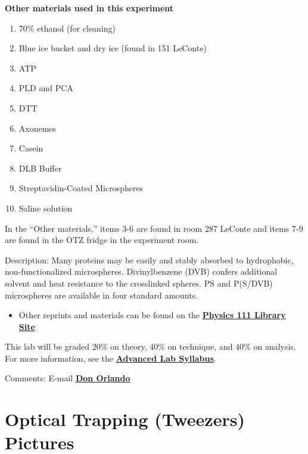 \documentclass{../lab}
\begin{document}
\newpage

\textbf{Other materials used in this experiment}

\begin{enumerate}
    \item 70\% ethanol (for cleaning)

    \item Blue ice bucket and dry ice (found in 151 LeConte)

    \item ATP

    \item PLD and PCA

    \item DTT

    \item Axonemes

    \item Casein

    \item DLB Buffer

    \item Streptavidin-Coated Microspheres

    \item Saline solution
\end{enumerate}

In the ``Other materials,'' items 3-6 are found in room 287 LeConte and items 7-9 are found in the OTZ fridge in the experiment room.

Description: Many proteins may be easily and stably absorbed to hydrophobic, non-functionalized microspheres. Divinylbenzene (DVB) confers additional solvent and heat resistance to the crosslinked spheres. PS and P(S/DVB) microspheres are available in four standard amounts.

\begin{itemize}
    \item Other reprints and materials can be found on the \href{http://physics111.lib.berkeley.edu/Physics111/Reprints/OTZ/OTZ\_index.html}{\textbf{Physics 111 Library Site}}
\end{itemize}

This lab will be graded 20\% on theory, 40\% on technique, and 40\% on analysis. For more information, see the \href{\AdvancedLabSyllabus}{\textbf{Advanced Lab Syllabus}}.

Comments: E-mail \href{\MailDonOrlando}{\textbf{Don Orlando}}

\section{Optical Trapping (Tweezers) Pictures}
\end{document}
